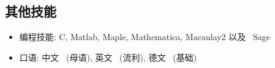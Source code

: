 \documentclass[a4paper,12pt]{article}
\begin{document}
\begin{CJK*}{UTF8}{gbsn}
\section*{\Large{其他技能}}
\begin{itemize}
 \item 编程技能: C, Matlab, Maple, Mathematica, Macaulay2 以及 \ Sage
 \item 口语: 中文 \ (母语), 英文 \ (流利), 德文 \ (基础)
\end{itemize}


\end{CJK*}
\end{document}
